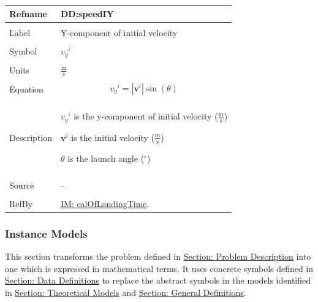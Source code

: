 \documentclass[12pt]{article}
\begin{document}
\noindent \begin{minipage}{\textwidth}
\begin{tabular}{p{} p{}}
\toprule \textbf{Refname} & \textbf{DD:speedIY}
\label{DD:speedIY}
\\ \midrule \\
Label & Y-component of initial velocity
\\ \midrule \\
Symbol & ${{v_{y}}^{i}}$
\\ \midrule \\
Units & $\frac{\text{m}}{\text{s}}$
\\ \midrule \\
Equation & \begin{displaymath}
           {{v_{y}}^{i}}=|{\mathbf{v}^{i}}| \sin\left(θ\right)
           \end{displaymath}
\\ \midrule \\
Description & \begin{symbDescription}
              \item{${{v_{y}}^{i}}$ is the y-component of initial velocity ($\frac{\text{m}}{\text{s}}$)}
              \item{${\mathbf{v}^{i}}$ is the initial velocity ($\frac{\text{m}}{\text{s}}$)}
              \item{$θ$ is the launch angle (${}^{\circ}$)}
              \end{symbDescription}
\\ \midrule \\
Source & --
\\ \midrule \\
RefBy & \hyperref[IM:calOfLandingTime]{IM: calOfLandingTime}.
\\ \bottomrule \end{tabular}
\end{minipage}
\subsubsection{Instance Models}
\label{Sec:IMs}
This section transforms the problem defined in \hyperref[Sec:ProbDesc]{Section: Problem Description} into one which is expressed in mathematical terms. It uses concrete symbols defined in \hyperref[Sec:DDs]{Section: Data Definitions} to replace the abstract symbols in the models identified in \hyperref[Sec:TMs]{Section: Theoretical Models} and \hyperref[Sec:GDs]{Section: General Definitions}.
\par~
\end{document}
